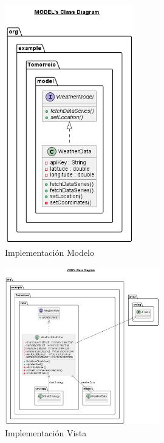 \documentclass{article}
\begin{document}
\begin{figure}[H]
  \centering
  \includegraphics[width=0.5\textwidth]{images/image11.png}
  \caption {Implementación Modelo}
  \label{fig:image11}
\end{figure}

\begin{figure}[H]
  \centering
  \includegraphics[width=0.6\textwidth]{images/image12.png}
  \caption {Implementación Vista}
  \label{fig:image12}
\end{figure}
\end{document}

